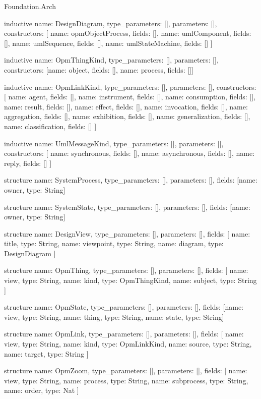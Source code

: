 \begin{lexlean}{Foundation.Arch}
\begin{semanticmodule}
inductive{
  name: DesignDiagram,
  type_parameters: [],
  parameters: [],
  constructors: [
    {name: opmObjectProcess, fields: []},
    {name: umlComponent, fields: []},
    {name: umlSequence, fields: []},
    {name: umlStateMachine, fields: []}
  ]
}

inductive{
  name: OpmThingKind,
  type_parameters: [],
  parameters: [],
  constructors: [{name: object, fields: []}, {name: process, fields: []}]
}

inductive{
  name: OpmLinkKind,
  type_parameters: [],
  parameters: [],
  constructors: [
    {name: agent, fields: []},
    {name: instrument, fields: []},
    {name: consumption, fields: []},
    {name: result, fields: []},
    {name: effect, fields: []},
    {name: invocation, fields: []},
    {name: aggregation, fields: []},
    {name: exhibition, fields: []},
    {name: generalization, fields: []},
    {name: classification, fields: []}
  ]
}

inductive{
  name: UmlMessageKind,
  type_parameters: [],
  parameters: [],
  constructors: [
    {name: synchronous, fields: []},
    {name: asynchronous, fields: []},
    {name: reply, fields: []}
  ]
}

structure{
  name: SystemProcess,
  type_parameters: [],
  parameters: [],
  fields: [{name: owner, type: String}]
}

structure{
  name: SystemState,
  type_parameters: [],
  parameters: [],
  fields: [{name: owner, type: String}]
}

structure{
  name: DesignView,
  type_parameters: [],
  parameters: [],
  fields: [
    {name: title, type: String},
    {name: viewpoint, type: String},
    {name: diagram, type: DesignDiagram}
  ]
}

structure{
  name: OpmThing,
  type_parameters: [],
  parameters: [],
  fields: [
    {name: view, type: String},
    {name: kind, type: OpmThingKind},
    {name: subject, type: String}
  ]
}

structure{
  name: OpmState,
  type_parameters: [],
  parameters: [],
  fields: [{name: view, type: String}, {name: thing, type: String}, {name: state, type: String}]
}

structure{
  name: OpmLink,
  type_parameters: [],
  parameters: [],
  fields: [
    {name: view, type: String},
    {name: kind, type: OpmLinkKind},
    {name: source, type: String},
    {name: target, type: String}
  ]
}

structure{
  name: OpmZoom,
  type_parameters: [],
  parameters: [],
  fields: [
    {name: view, type: String},
    {name: process, type: String},
    {name: subprocess, type: String},
    {name: order, type: Nat}
  ]
}


\end{semanticmodule}
\end{lexlean}
